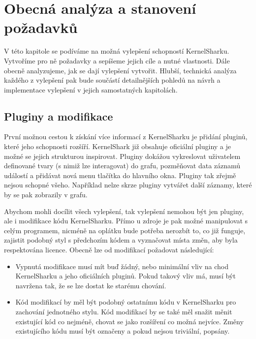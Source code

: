 \chapter{Obecná analýza a stanovení požadavků}
V této kapitole se podíváme na možná vylepšení schopností KernelSharku. Vytvoříme pro ně požadavky a sepíšeme jejich cíle a nutné vlastnosti. Dále obecně analyzujeme, jak se dají vylepšení vytvořit. Hlubší, technická analýza každého z vylepšení pak bude součástí detailnějších pohledů na návrh a implementace vylepšení v jejich samostatných kapitolách. 

\section{Pluginy a modifikace}
První možnou cestou k získání více informací z KernelSharku je přidání pluginů, které jeho schopnosti rozšíří. KernelShark již obsahuje oficiální pluginy a je možné se jejich strukturou inspirovat. Pluginy dokážou vykreslovat uživatelem definované tvary (s nimiž lze interagovat) do grafu, pozměňovat data záznamů událostí a přidávat nová menu tlačítka do hlavního okna. Pluginy tak zřejmě nejsou schopné všeho. Například nelze skrze pluginy vytvářet další záznamy, které by se pak zobrazily v grafu.

Abychom mohli docílit všech vylepšení, tak vylepšení nemohou být jen pluginy, ale i modifikace kódu KernelSharku. Přímo u zdroje je pak možné manipulovat s celým programem, nicméně na oplátku bude potřeba nerozbít to, co již funguje, zajistit podobný styl s předchozím kódem a vyznačovat místa změn, aby byla respektována licence. Obecně lze od modifikací požadovat následující:
\begin{itemize}
    \item Vypnutá modifikace musí mít buď žádný, nebo minimální vliv na chod KernelSharku a jeho oficiálních pluginů. Pokud takový vliv má, musí být navržena tak, že se lze dostat ke starému chování.
    \item Kód modifikací by měl být podobný ostatnímu kódu v KernelSharku pro zachování jednotného stylu. Kód modifikací by se také měl snažit měnit existující kód co nejméně, chovat se jako rozšíření co možná nejvíce. Změny existujícího kódu musí být označeny a pokud nejsou triviální, popsány.
\end{itemize}

